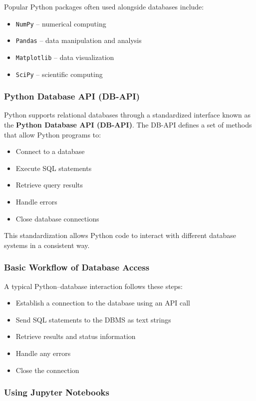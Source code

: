 \documentclass{article}
\begin{document}
Popular Python packages often used alongside databases include:
\begin{itemize}
    \item \texttt{NumPy} – numerical computing
    \item \texttt{Pandas} – data manipulation and analysis
    \item \texttt{Matplotlib} – data visualization
    \item \texttt{SciPy} – scientific computing
\end{itemize}

\subsubsection{Python Database API (DB-API)}

Python supports relational databases through a standardized interface known as the \textbf{Python Database API (DB-API)}.  
The DB-API defines a set of methods that allow Python programs to:
\begin{itemize}
    \item Connect to a database
    \item Execute SQL statements
    \item Retrieve query results
    \item Handle errors
    \item Close database connections
\end{itemize}
This standardization allows Python code to interact with different database systems in a consistent way.

\subsubsection{Basic Workflow of Database Access}

A typical Python–database interaction follows these steps:
\begin{itemize}
    \item Establish a connection to the database using an API call
    \item Send SQL statements to the DBMS as text strings
    \item Retrieve results and status information
    \item Handle any errors
    \item Close the connection
\end{itemize}

\subsubsection{Using Jupyter Notebooks}
\end{document}
